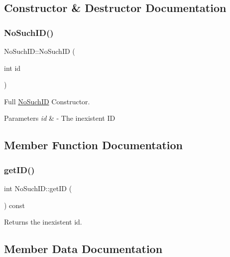 \subsection{Constructor \& Destructor Documentation}
\mbox{\label{classNoSuchID_a3b85ef775a99d9f93eabaa21ef29e950}} 
\subsubsection{\texorpdfstring{No\+Such\+I\+D()}{NoSuchID()}}
{\footnotesize\ttfamily No\+Such\+I\+D\+::\+No\+Such\+ID (\begin{DoxyParamCaption}\item[{int}]{id }\end{DoxyParamCaption})\hspace{0.3cm}{\ttfamily [inline]}}



Full \mbox{\hyperlink{classNoSuchID}{No\+Such\+ID}} Constructor. 


\begin{DoxyParams}{Parameters}
{\em id} & -\/ The inexistent ID \\
\hline
\end{DoxyParams}


\subsection{Member Function Documentation}
\mbox{\label{classNoSuchID_a42be677d2a3bbf7c12feffeda0904bfa}} 
\subsubsection{\texorpdfstring{get\+I\+D()}{getID()}}
{\footnotesize\ttfamily int No\+Such\+I\+D\+::get\+ID (\begin{DoxyParamCaption}{ }\end{DoxyParamCaption}) const\hspace{0.3cm}{\ttfamily [inline]}}



Returns the inexistent id. 



\subsection{Member Data Documentation}
\mbox{\label{classNoSuchID_a1b0c95e546b2147a298230f33d3dbeec}} 
